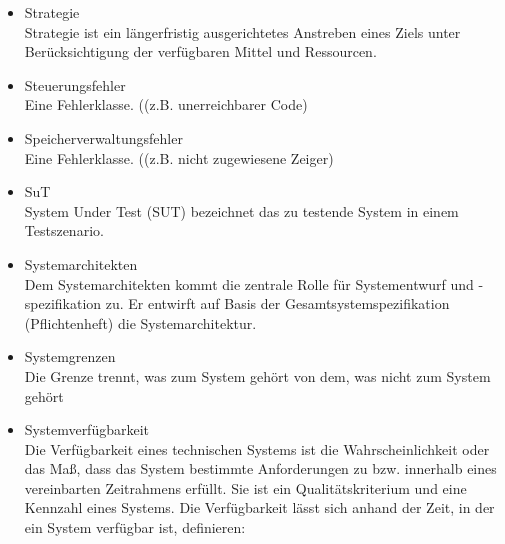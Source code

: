 \begin{itemize}
\item 	Strategie\\
Strategie ist ein längerfristig ausgerichtetes Anstreben eines Ziels unter Berücksichtigung der verfügbaren Mittel und Ressourcen.
\item Steuerungsfehler \\ Eine Fehlerklasse. ((z.B. unerreichbarer Code)
\item Speicherverwaltungsfehler \\ Eine Fehlerklasse. ((z.B. nicht zugewiesene Zeiger)
\item 	SuT\\System Under Test (SUT) bezeichnet das zu testende System in einem Testszenario.
\item 	Systemarchitekten\\Dem Systemarchitekten kommt die zentrale Rolle für Systementwurf und -spezifikation zu. Er entwirft auf Basis der Gesamtsystemspezifikation (Pflichtenheft) die Systemarchitektur.
\item 	Systemgrenzen\\Die Grenze trennt, was zum System gehört von dem, was nicht zum System gehört
\item 	Systemverfügbarkeit \\Die Verfügbarkeit eines technischen Systems ist die Wahrscheinlichkeit oder das Maß, dass das System bestimmte Anforderungen zu bzw. innerhalb eines vereinbarten Zeitrahmens erfüllt. Sie ist ein Qualitätskriterium und eine Kennzahl eines Systems. Die Verfügbarkeit lässt sich anhand der Zeit, in der ein System verfügbar ist, definieren:


\end{itemize}
